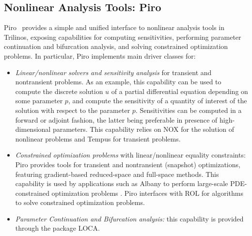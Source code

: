\subsection{Nonlinear Analysis Tools: Piro}
Piro~\cite{osti_1231283} provides a simple and unified interface to nonlinear analysis tools in Trilinos, exposing capabilities for computing sensitivities, performing parameter continuation and bifurcation analysis, and solving constrained optimization problems.
In particular, Piro implements main driver classes for:
\begin{itemize}
	\item \emph{Linear/nonlinear solvers and sensitivity analysis} for transient and nontransient problems. As an example, this capability can be used to compute the discrete solution $u$ of a partial differential equation depending on some parameter $p$, and compute the sensitivity of a quantity of interest of the solution with respect to the parameter $p$. Sensitivities can be computed in a forward or adjoint fashion, the latter being preferable in presence of high-dimensional parameters. This capability relies on NOX for the solution of nonlinear problems and Tempus for transient problems.
	\item \emph{Constrained optimization problems} with linear/nonlinear equality constraints: Piro provides tools for transient and nontransient (snapshot) optimizations, featuring gradient-based reduced-space and full-space methods. This capability is used by applications such as Albany to perform large-scale PDE-constrained optimization problems \cite{Perego2022}. Piro interfaces with ROL for algorithms to solve constrained optimization problems.
\item \emph{Parameter Continuation and Bifurcation analysis:} this capability is provided through the package LOCA.
\end{itemize}
